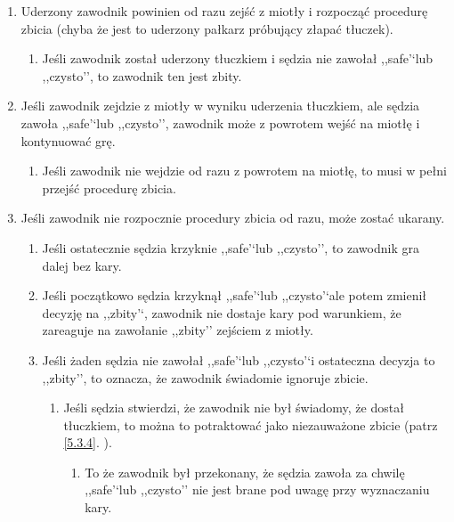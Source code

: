 \documentclass[11pt,a4paper]{article}
\newcommand{\myref}[1]{\ref{#1}. \nameref{#1}}
\begin{document}
\begin{enumerate}

\item
  Uderzony zawodnik powinien od razu zejść z miotły i rozpocząć
  procedurę zbicia (chyba że jest to uderzony pałkarz próbujący złapać
  tłuczek).

  \begin{enumerate}
  
  \item
    Jeśli zawodnik został uderzony tłuczkiem i sędzia nie zawołał
    ,,safe'`lub ,,czysto'', to zawodnik ten jest zbity.
  \end{enumerate}
\item
  Jeśli zawodnik zejdzie z miotły w wyniku uderzenia tłuczkiem, ale
  sędzia zawoła ,,safe'`lub ,,czysto'', zawodnik może z powrotem wejść
  na miotłę i kontynuować grę.

  \begin{enumerate}
  
  \item
    Jeśli zawodnik nie wejdzie od razu z powrotem na miotłę, to musi w
    pełni przejść procedurę zbicia.
  \end{enumerate}
\item
  Jeśli zawodnik nie rozpocznie procedury zbicia od razu, może zostać
  ukarany.

  \begin{enumerate}
  
  \item
    Jeśli ostatecznie sędzia krzyknie ,,safe'`lub ,,czysto'', to
    zawodnik gra dalej bez kary.
  \item
    Jeśli początkowo sędzia krzyknął ,,safe'`lub ,,czysto'`ale potem
    zmienił decyzję na ,,zbity'`, zawodnik nie dostaje kary pod
    warunkiem, że zareaguje na zawołanie ,,zbity'' zejściem z miotły.
  \item
    Jeśli żaden sędzia nie zawołał ,,safe'`lub ,,czysto'`i ostateczna
    decyzja to ,,zbity'', to oznacza, że zawodnik świadomie ignoruje
    zbicie.

    \begin{enumerate}
    
    \item
      Jeśli sędzia stwierdzi, że zawodnik nie był świadomy, że dostał
      tłuczkiem, to można to potraktować jako niezauważone zbicie (patrz
      \myref{5.3.4}).

      \begin{enumerate}
      
      \item
        To że zawodnik był przekonany, że sędzia zawoła za chwilę
        ,,safe'`lub ,,czysto'' nie jest brane pod uwagę przy wyznaczaniu
        kary.
      \end{enumerate}
    \end{enumerate}
  \end{enumerate}
\end{enumerate}
\end{document}
